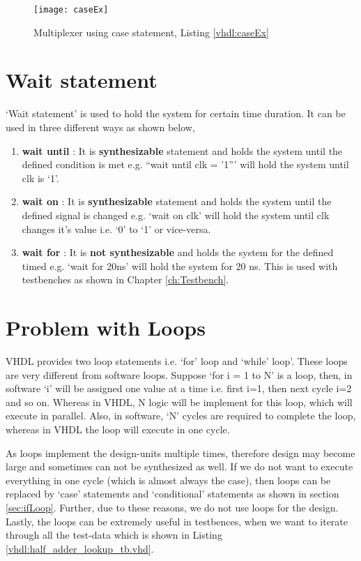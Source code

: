 
\begin{figure}
	\centering
	\texttt{[image: caseEx]}
	\caption{Multiplexer using case statement, Listing \ref{vhdl:caseEx}}
	\label{fig:caseEx}
\end{figure}

\section{Wait statement}
`Wait statement' is used to hold the system for certain time duration. It can be used in three different ways as shown below, 

\begin{enumerate}
	\item \textbf{wait until} : It is \textbf{synthesizable} statement and holds the system until the defined condition is met e.g. ``wait until clk = '1''' will hold the system until clk is `1'. 
	
	\item \textbf{wait on} : It is \textbf{synthesizable} statement and holds the system until the defined signal is changed e.g. `wait on clk' will hold the system until clk changes it's value i.e. `0' to `1' or vice-versa.
	
	\item \textbf{wait for} : It is \textbf{not synthesizable} and holds the system for the defined timed e.g. `wait for 20ns' will hold the system for 20 ns. This is used with testbenches as shown in Chapter \ref{ch:Testbench}.
\end{enumerate}

\section{Problem with Loops}

VHDL provides two loop statements i.e. `for' loop and `while' loop'. These loops are very different from software loops. Suppose `for i = 1 to N' is a loop, then, in software `i' will be assigned one value at a time i.e. first i=1, then next cycle i=2 and so on. Whereas in VHDL, N logic will be implement for this loop, which will execute in parallel. Also, in software, `N' cycles are required to complete the loop, whereas in VHDL the loop will execute in one cycle. 
\begin{noNumBox}
	As loops implement the design-units multiple times, therefore design may become large and sometimes can not be synthesized as well. If we do not want to execute everything in one cycle (which is almost always the case), then loops can be replaced by `case' statements and `conditional' statements as shown in section \ref{sec:ifLoop}. Further, due to these reasons, we do not use loops for the design. Lastly, the loops can be extremely useful in testbences, when we want to iterate through all the test-data which is shown in Listing \ref{vhdl:half_adder_lookup_tb.vhd}.  
\end{noNumBox}   

